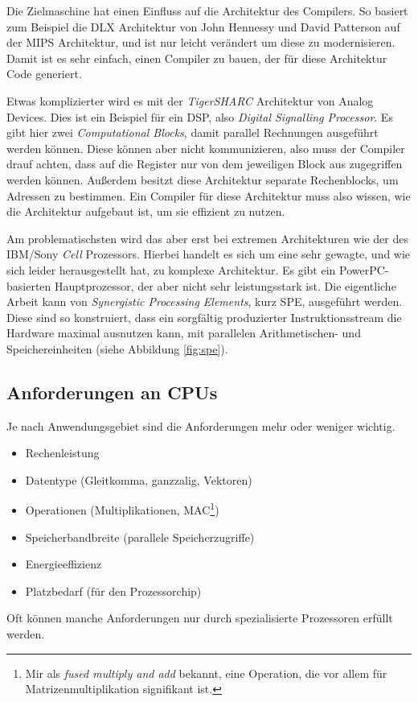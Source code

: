 \documentclass[ngerman]{scrartcl}
\begin{document}
Die Zielmaschine hat einen Einfluss auf die Architektur des Compilers. So basiert zum Beispiel die DLX Architektur von John Hennessy und David Patterson auf der MIPS Architektur, und ist nur leicht verändert um diese zu modernisieren. Damit ist es sehr einfach, einen Compiler zu bauen, der für diese Architektur Code generiert.

Etwas komplizierter wird es mit der \emph{TigerSHARC} Architektur von Analog Devices. Dies ist ein Beispiel für ein DSP, also \emph{Digital Signalling Processor}. Es gibt hier zwei \emph{Computational Blocks}, damit parallel Rechnungen ausgeführt werden können. Diese können aber nicht kommunizieren, also muss der Compiler drauf achten, dass auf die Register nur von dem jeweiligen Block aus zugegriffen werden können. Außerdem besitzt diese Architektur separate Rechenblocks, um Adressen zu bestimmen. Ein Compiler für diese Architektur muss also wissen, wie die Architektur aufgebaut ist, um sie effizient zu nutzen.

Am problematischsten wird das aber erst bei extremen Architekturen wie der des IBM/Sony \emph{Cell} Prozessors. Hierbei handelt es sich um eine sehr gewagte, und wie sich leider herausgestellt hat, zu komplexe Architektur. Es gibt ein PowerPC-basierten Hauptprozessor, der aber nicht sehr leistungsstark ist. Die eigentliche Arbeit kann von \emph{Synergistic Processing Elements}, kurz SPE, ausgeführt werden. Diese sind so konstruiert, dass ein sorgfältig produzierter Instruktionsstream die Hardware maximal ausnutzen kann, mit parallelen Arithmetischen- und Speichereinheiten (siehe Abbildung \ref{fig:spe}).

\subsection{Anforderungen an CPUs}

Je nach Anwendungsgebiet sind die Anforderungen mehr oder weniger wichtig. 
\begin{itemize}
  \item Rechenleistung
  \item Datentype (Gleitkomma, ganzzalig, Vektoren)
  \item Operationen (Multiplikationen, MAC\footnote{Mir als \emph{fused multiply and add} bekannt, eine Operation, die vor allem für Matrizenmultiplikation signifikant ist.})
  \item Speicherbandbreite (parallele Speicherzugriffe)
  \item Energieeffizienz
  \item Platzbedarf (für den Prozessorchip)
\end{itemize}
Oft können manche Anforderungen nur durch spezialisierte Prozessoren erfüllt werden.
\end{document}
